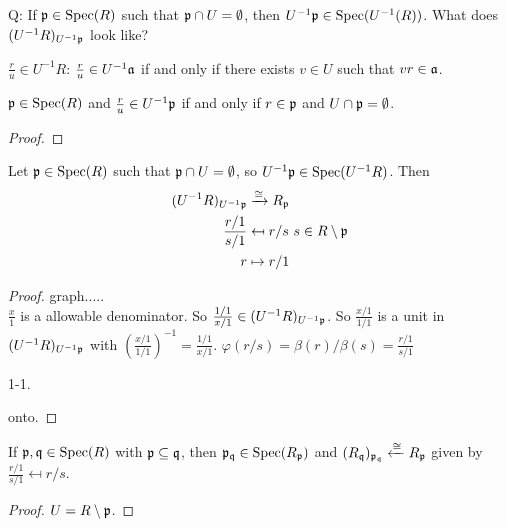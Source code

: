 Q: If $\mathfrak{p} \in \operatorname{Spec}(R)$ such that $\mathfrak{p} \cap U = \emptyset$, then $U^{-1}\mathfrak{p} \in \operatorname{Spec}(U^{-1}(R))$. What does $(U^{-1}R)_{U^{-1}\mathfrak{p}}$ look like?

\begin{recall*}
    $\frac{r}{u} \in U^{-1}R$: $\frac{r}{u} \in U^{-1}\mathfrak{a}$ if and only if there exists $v \in U$ such that $vr \in \mathfrak{a}$.
\end{recall*}

\begin{lemma}
    $\mathfrak{p} \in \operatorname{Spec}(R)$ and $\frac{r}{u} \in U^{-1}\mathfrak{p}$ if and only if $r \in \mathfrak{p}$ and $U \cap \mathfrak{p} = \emptyset$.
\end{lemma}

\begin{proof}

\end{proof}

\begin{proposition}
    Let $\mathfrak{p} \in \operatorname{Spec}(R)$ such that $\mathfrak{p} \cap U = \emptyset$, so $U^{-1}\mathfrak{p} \in \operatorname{Spec}(U^{-1}R)$. Then 
    \begin{align*}
        (U^{-1}R)_{U^{-1}\mathfrak{p}} &\xrightarrow \cong R_{\mathfrak{p}} \\
        \frac{r/1}{s/1} &\mapsfrom r/s \ s \in R \setminus \mathfrak{p} \\
        r &\mapsto r/1
    \end{align*}
\end{proposition}

\begin{proof}
    graph..... \\
    $\frac{x}{1}$ is a allowable denominator. So $\frac{1/1}{x/1} \in (U^{-1}R)_{U^{-1}\mathfrak{p}}$. So $\frac{x/1}{1/1}$ is a unit in $(U^{-1}R)_{U^{-1}\mathfrak{p}}$ with $(\frac{x/1}{1/1})^{-1} = \frac{1/1}{x/1}$. $\varphi(r/s) = \beta(r)/\beta(s) = \frac{r/1}{s/1}$ \par 
    1-1. \par 
    onto. \par 
\end{proof}

\begin{corollary}
    If $\mathfrak{p},\mathfrak{q} \in \operatorname{Spec}(R)$ with $\mathfrak{p} \subseteq \mathfrak{q}$, then $\mathfrak{p}_{\mathfrak{q}} \in \operatorname{Spec}(R_{\mathfrak{p}})$ and $(R_{\mathfrak{q}})_{\mathfrak{p}_{\mathfrak{q}}} \xleftarrow \cong R_{\mathfrak{p}}$ given by $\frac{r/1}{s/1} \mapsfrom r/s$.
\end{corollary}

\begin{proof}
    $U = R \setminus \mathfrak{p}$.
\end{proof}

